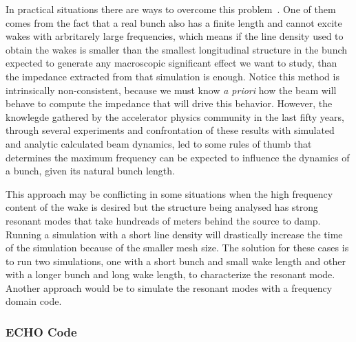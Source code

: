    In practical situations there are ways to overcome this problem~\cite{refs}. One of them comes from the fact that a real bunch also has a finite length and cannot excite wakes with arbritarely large frequencies, which means if the line density used to obtain the wakes is smaller than the smallest longitudinal structure in the bunch expected to generate any macroscopic significant effect we want to study, than the impedance extracted from that simulation is enough. Notice this method is intrinsically non-consistent, because we must know \emph{a priori} how the beam will behave to compute the impedance that will drive this behavior. However, the knowlegde gathered by the accelerator physics community in the last fifty years, through several experiments and confrontation of these results with simulated and analytic calculated beam dynamics, led to some rules of thumb that determines the maximum frequency can be expected to influence the dynamics of a bunch, given its natural bunch length.

    This approach may be conflicting in some situations when the high frequency content of the wake is desired but the structure being analysed has strong resonant modes that take hundreads of meters behind the source to damp. Running a simulation with a short line density will drastically increase the time of the simulation because of the smaller mesh size. The solution for these cases is to run two simulations, one with a short bunch and small wake length and other with a longer bunch and long wake length, to characterize the resonant mode. Another approach would be to simulate the resonant modes with a frequency domain code.

\subsubsection{ECHO Code}


